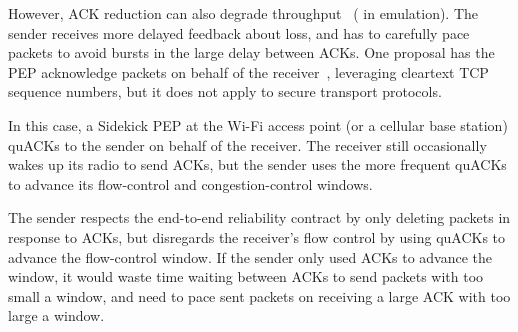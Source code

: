 However, ACK reduction can also degrade
throughput~\cite{custura2023reducing,custura2020impact}
( in emulation).
The sender receives more delayed feedback about loss, and has to carefully
pace packets to avoid bursts in the large delay between ACKs.
One proposal has the PEP acknowledge packets on behalf of the
receiver~\cite{kliazovich2012arqproxy}, leveraging cleartext TCP sequence
numbers, but it does not apply to secure transport protocols.

In this case, a Sidekick PEP at the Wi-Fi access point (or a cellular base station)
quACKs to the sender on behalf of the receiver. The receiver still occasionally
wakes up its radio to send ACKs, but the sender uses the more frequent quACKs
to advance its flow-control and congestion-control windows.

The sender respects the end-to-end reliability contract by only deleting packets
in response to ACKs, but disregards the receiver's flow control by using quACKs
to advance the flow-control window. If the sender only used ACKs to advance the
window, it would waste time waiting between ACKs to send packets with too small
a window, and need to pace sent packets on receiving a large ACK with too large
a window.
